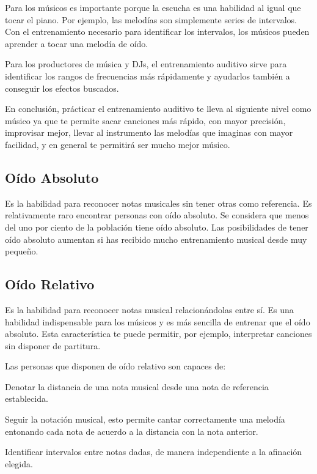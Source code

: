 \documentclass[12pt,twoside,titlepage]{report}
\begin{document}
Para los músicos es importante porque la escucha es una habilidad al igual que tocar el piano. Por ejemplo, las melodías son simplemente series de intervalos. Con el entrenamiento necesario para identificar los intervalos, los músicos pueden aprender a tocar una melodía de oído.

Para los productores de música y DJs, el entrenamiento auditivo sirve para identificar los rangos de frecuencias más rápidamente y ayudarlos también a conseguir los efectos buscados.

En conclusión, prácticar el entrenamiento auditivo te lleva al siguiente nivel como músico ya que te permite sacar canciones más rápido, con mayor precisión, improvisar mejor, llevar al instrumento las melodías que imaginas con mayor facilidad, y en general te permitirá ser mucho mejor músico.

\subsection{Oído Absoluto}

Es la habilidad para reconocer notas musicales sin tener otras como referencia. Es relativamente raro encontrar personas con oído absoluto. Se considera que menos del uno por ciento de la población tiene oído absoluto. Las posibilidades de tener oído absoluto aumentan si has recibido mucho entrenamiento musical desde muy pequeño.

\subsection{Oído Relativo}

Es la habilidad para reconocer notas musical relacionándolas entre sí. Es una habilidad indispensable para los músicos y es más sencilla de entrenar que el oído absoluto. Esta característica te puede permitir, por ejemplo, interpretar canciones sin disponer de partitura.

Las personas que disponen de oído relativo son capaces de:
\begin{compactitem}
    \item Denotar la distancia de una nota musical desde una nota de referencia establecida.
    \item Seguir la notación musical, esto permite cantar correctamente una melodía entonando cada nota de acuerdo a la distancia con la nota anterior.
    \item Identificar intervalos entre notas dadas, de manera independiente a la afinación elegida.
\end{compactitem}
\end{document}
